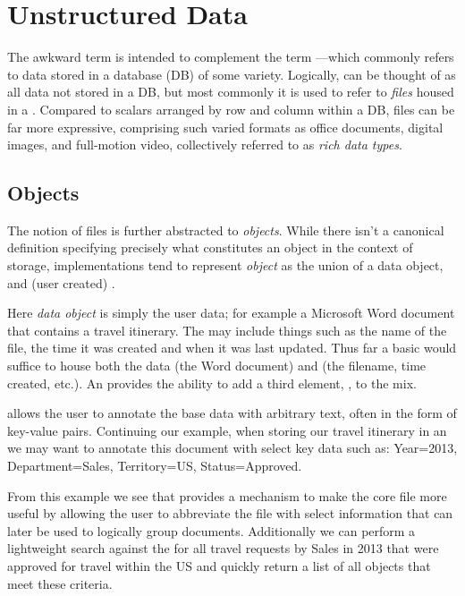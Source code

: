 
\section{Unstructured Data} \label{s:ud}
The awkward term \emph{\ud} is intended to complement the term \emph{\sd}---which commonly refers to data stored in a database (DB) of some variety. Logically, \ud{} can be thought of as all data not stored in a DB, but most commonly it is used to refer to \emph{files} housed in a \hfs{}. Compared to scalars arranged by row and column within a DB, files can be far more expressive, comprising such varied formats as office documents, digital images, and full-motion video, collectively referred to as \emph{rich data types}.

\subsection{Objects} \label{s:obj}
The notion of files is further abstracted to \emph{objects}. While there isn't a canonical definition specifying precisely what constitutes an object in the context of storage, \os{} implementations tend to represent \emph{object} as the union of a data object, \fsm{} and (user created) \cmd{}.

Here \emph{data object} is simply the user data; for example a Microsoft Word document that contains a travel itinerary. The \emph{\fsm{}} may include things such as the name of the file, the time it was created and when it was last updated. Thus far a basic \fs{} would suffice to house both the data (the Word document) and \fsm{} (the filename, time created, etc.). An \os{} provides the ability to add a third element, \emph{\cmd{}}, to the mix.

\Cmd{} allows the user to annotate the base data with arbitrary text, often in the form of key-value pairs. Continuing our example, when storing our travel itinerary in an \os{} we may want to annotate this document with select key data such as: Year=2013, Department=Sales, Territory=US, Status=Approved.

From this example we see that \cmd{} provides a mechanism to make the core file more useful by allowing the user to abbreviate the file with select information that can later be used to logically group documents. Additionally we can perform a lightweight search against the \os{} for all travel requests by Sales in 2013 that were approved for travel within the US and quickly return a list of all objects that meet these criteria.

